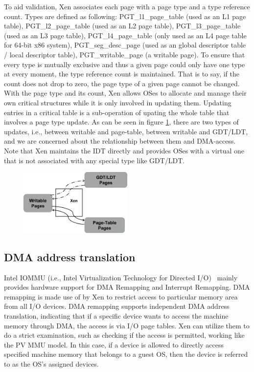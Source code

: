 To aid validation, Xen associates each page with a page type and a type reference count. Types are defined as following: PGT\_l1\_page\_table (used as an L1 page table), PGT\_l2\_page\_table (used as an L2 page table), PGT\_l3\_page\_table (used as an L3 page table), PGT\_l4\_page\_table (only used as an L4 page table for 64-bit x86 system), PGT\_seg\_desc\_page (used as an global descriptor table / local descriptor table), PGT\_writable\_page (a writable page). To ensure that every type is mutually exclusive and thus a given page could only have one type at every moment, the type reference count is maintained. That is to say, if the count does not drop to zero, the page type of a given page cannot be changed. With the page type and its count, Xen allows OSes to allocate and manage their own critical structures while it is only involved in updating them. Updating entries in a critical table  is a sub-operation of upating the whole table that involves a page type update. As can be seen in figure \ref{fig:page-type-update}, there are two types of updates, i.e., between writable and page-table, between writable and GDT/LDT, and we are concerned about the relationship between them and DMA-access. Note that Xen maintains the IDT directly and provides OSes with a virtual one that is not associated with any special type like GDT/LDT. 

\begin{figure}[ht]
\centering
\includegraphics[width=0.5\textwidth]{image/background/page-type-update.png} \\
\caption{}
\label{fig:page-type-update}
\end{figure}

\subsection{DMA address translation}

Intel IOMMU (i.e., Intel Virtualization Technology for Directed I/O)~\cite{intelvt} mainly provides hardware support for DMA Remapping and Interrupt Remapping. DMA remapping is made use of by Xen to restrict access to particular memory area from all I/O devices. DMA remapping supports independent DMA address translation, indicating that if a specific device wants to access the machine memory through DMA, the access is via I/O page tables. Xen can utilize them to do a strict examination, such as checking if the access is permitted, working like the PV MMU model. In this case, if a device is allowed to directly access specified machine memory that belongs to a guest OS, then the device is referred to as the OS's assigned devices.

